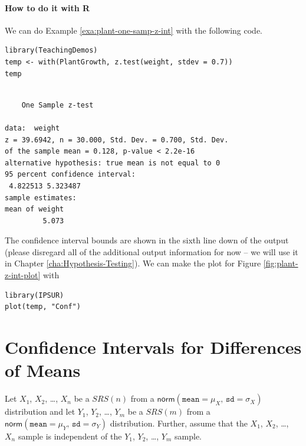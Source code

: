 \documentclass[captions=tableheading]{scrbook}
\begin{document}
\paragraph*{How to do it with \textsf{R}}
We can do Example \ref{exa:plant-one-samp-z-int} with the following code.



\begin{verbatim}
library(TeachingDemos)
temp <- with(PlantGrowth, z.test(weight, stdev = 0.7))
temp
\end{verbatim}


\begin{verbatim}
 
	One Sample z-test

data:  weight 
z = 39.6942, n = 30.000, Std. Dev. = 0.700, Std. Dev.
of the sample mean = 0.128, p-value < 2.2e-16
alternative hypothesis: true mean is not equal to 0 
95 percent confidence interval:
 4.822513 5.323487 
sample estimates:
mean of weight 
         5.073
\end{verbatim}

The confidence interval bounds are shown in the sixth line down of the output (please disregard all of the additional output information for now -- we will use it in Chapter \ref{cha:Hypothesis-Testing}). We can make the plot for Figure \ref{fig:plant-z-int-plot} with


\begin{verbatim}
library(IPSUR)
plot(temp, "Conf")
\end{verbatim}
\section{Confidence Intervals for Differences of Means}
\label{sec-9-3}

\label{sec:Conf-Interv-for-Diff-Means}

Let \(X_{1}\), \(X_{2}\), \ldots{}, \(X_{n}\) be a \(SRS(n)\) from a \(\mathsf{norm}(\mathtt{mean}=\mu_{X},\,\mathtt{sd}=\sigma_{X})\) distribution and let \(Y_{1}\), \(Y_{2}\), \ldots{}, \(Y_{m}\) be a \(SRS(m)\) from a \(\mathsf{norm}(\mathtt{mean}=\mu_{Y},\,\mathtt{sd}=\sigma_{Y})\) distribution. Further, assume that the \(X_{1}\), \(X_{2}\), \ldots{}, \(X_{n}\) sample is independent of the \(Y_{1}\), \(Y_{2}\), \ldots{}, \(Y_{m}\) sample.
\end{document}
